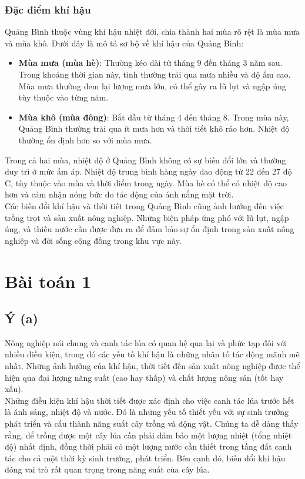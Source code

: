 \documentclass[12pt]{report}
\begin{document}
\subsection{Đặc điểm khí hậu} %
\begin{flushleft}
	Quảng Bình thuộc vùng khí hậu nhiệt đới, chia thành hai mùa rõ rệt là mùa mưa và mùa khô. Dưới đây là mô tả sơ bộ về khí hậu của Quảng Bình:
	\begin{itemize}
		\item \textbf{Mùa mưa (mùa hè)}: Thường kéo dài từ tháng 9 đến tháng 3 năm sau. Trong khoảng thời gian này, tỉnh thường trải qua mưa nhiều và độ ẩm cao. Mùa mưa thường đem lại lượng mưa lớn, có thể gây ra lũ lụt và ngập úng tùy thuộc vào từng năm.

		\item \textbf{Mùa khô (mùa đông)}: Bắt đầu từ tháng 4 đến tháng 8. Trong mùa này, Quảng Bình thường trải qua ít mưa hơn và thời tiết khô ráo hơn. Nhiệt độ thường ổn định hơn so với mùa mưa.
	\end{itemize}

	Trong cả hai mùa, nhiệt độ ở Quảng Bình không có sự biến đổi lớn và thường duy trì ở mức ấm áp. Nhiệt độ trung bình hàng ngày dao động từ 22 đến 27 độ C, tùy thuộc vào mùa và thời điểm trong ngày. Mùa hè có thể có nhiệt độ cao hơn và cảm nhận nóng bức do tác động của ánh nắng mặt trời.
	\\[\baselineskip]

	Các biến đổi khí hậu và thời tiết trong Quảng Bình cũng ảnh hưởng đến việc trồng trọt và sản xuất nông nghiệp. Những biện pháp ứng phó với lũ lụt, ngập úng, và thiếu nước cần được đưa ra để đảm bảo sự ổn định trong sản xuất nông nghiệp và đời sống cộng đồng trong khu vực này.
\end{flushleft}

\chapter{Bài toán 1}
\section{Ý (a)} %

\begin{flushleft}
	Nông nghiệp nói chung và canh tác lúa có quan hệ qua lại và phức tạp đối với nhiều điều kiện, trong đó các yếu tố khí hậu là những nhân tố tác động mãnh mẽ nhất. Những ảnh hưởng của khí hậu, thời tiết đến sản xuất nông nghiệp được thể hiện qua đại lượng năng suất (cao hay thấp) và chất lượng nông sản (tốt hay xấu).
	\\[\baselineskip]

	Những điều kiện khí hậu thời tiết được xác định cho việc canh tác lúa trước hết là ánh sáng, nhiệt độ và nước. Đó là những yếu tố thiết yếu với sự sinh trưởng phát triển và cấu thành năng suất cây trồng và động vật. Chúng ta dễ dàng thấy rằng, để trồng được một cây lúa cần phải đảm bảo một lượng nhiệt (tổng nhiệt độ) nhất định, đồng thời phải có một lượng nước cần thiết trong tầng đất canh tác cho cả một thời kỳ sinh trưởng, phát triển. Bên cạnh đó, biến đổi khí hậu đóng vai trò rất quan trọng trong năng suất của cây lúa.
\end{flushleft}
\end{document}
